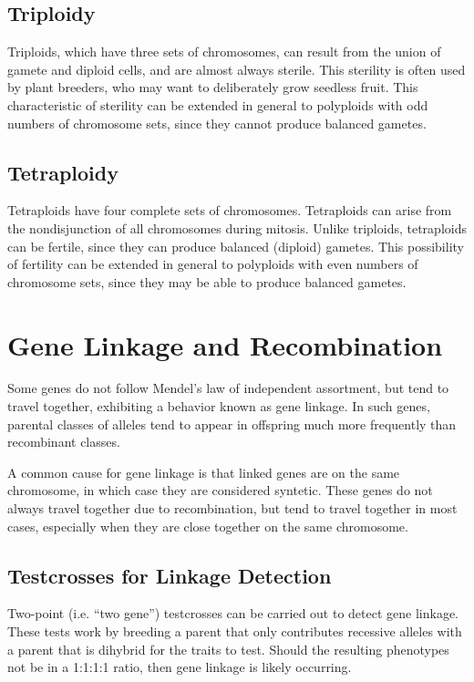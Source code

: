 \documentclass[12pt,titlepage]{article}
\begin{document}
    \subsection{Triploidy}
      Triploids, which have three sets of chromosomes, can result from the union of gamete and diploid cells, and are almost always sterile.
      This sterility is often used by plant breeders, who may want to deliberately grow seedless fruit. This characteristic of sterility can
      be extended in general to polyploids with odd numbers of chromosome sets, since they cannot produce balanced gametes.

    \subsection{Tetraploidy}
      Tetraploids have four complete sets of chromosomes. Tetraploids can arise from the nondisjunction of all chromosomes during mitosis. Unlike triploids,
      tetraploids can be fertile, since they can produce balanced (diploid) gametes. This possibility of fertility can be extended in general to polyploids
      with even numbers of chromosome sets, since they may be able to produce balanced gametes.

  \newpage

  \section{Gene Linkage and Recombination}
    Some genes do not follow Mendel's law of independent assortment, but tend to travel together, exhibiting a behavior known as gene linkage. In such
    genes, parental classes of alleles tend to appear in offspring much more frequently than recombinant classes.

    A common cause for gene linkage is that linked genes are on the same chromosome, in which case they are considered syntetic. These genes do not always
    travel together due to recombination, but tend to travel together in most cases, especially when they are close together on the same chromosome.

    \subsection{Testcrosses for Linkage Detection}
      Two-point (i.e. ``two gene'') testcrosses can be carried out to detect gene linkage. These tests work by breeding a parent that only contributes
      recessive alleles with a parent that is dihybrid for the traits to test. Should the resulting phenotypes not be in a 1:1:1:1 ratio, then gene linkage
      is likely occurring.
\end{document}
